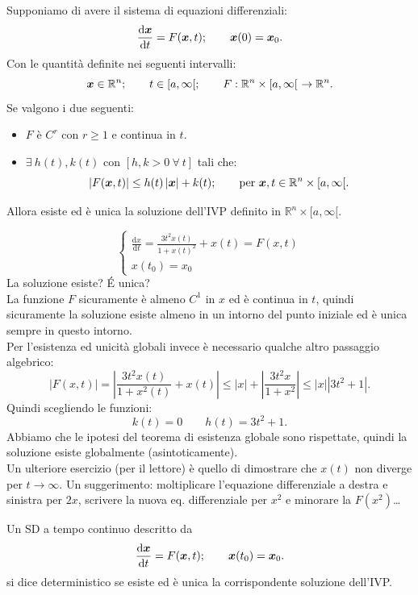 \noindent
\begin{thm}
    Supponiamo di avere il sistema di equazioni differenziali:
    \[
	\frac{\text{d} \boldsymbol{x}}{\text{d} t} = F(\boldsymbol{x},t); \qquad \boldsymbol{x}(0) = \boldsymbol{x}_0
    .\] 
    Con le quantità definite nei seguenti intervalli:
    \[
        \boldsymbol{x}\in \mathbb{R}^n; \qquad t \in [a,\infty[; \qquad F: \mathbb{R}^n\times [a,\infty[ \ \to \mathbb{R}^n
    .\] 
    Se valgono i due seguenti:
    \begin{itemize}
        \item $F$ è $C^r$ con $r\ge 1$ e continua in $t$.
	\item $\exists \ h(t), k(t)$ con $\left[h, k > 0 \ \forall \ t\right]$ tali che:
	    \[
		\left|F(\boldsymbol{x}, t)\right|\le h(t)\left|\boldsymbol{x}\right|+k(t); \qquad \text{per } \boldsymbol{x}, t \in \mathbb{R}^n\times [a, \infty[
	    .\] 
    \end{itemize}
    Allora esiste ed è unica la soluzione dell'IVP definito in $\mathbb{R}^n\times [a,\infty[$.
\end{thm}
\noindent
\begin{exmp}
   \[
       \begin{cases}
	   \frac{\text{d} x}{\text{d} t} = \frac{3t^2x(t)}{1+x(t)^2}+x(t) = F(x,t)\\
	   x(t_0)=x_0
       \end{cases}
   \]  
   La soluzione esiste? \'E unica? \\
   La funzione $F$  sicuramente è almeno $C^1$  in $x$  ed è continua in $t$, quindi sicuramente la soluzione esiste almeno in un intorno del punto iniziale ed è unica sempre in questo intorno.\\
   Per l'esistenza ed unicità globali invece è necessario qualche altro passaggio algebrico:
   \[
       \left|F(x,t)\right| = \left|\frac{3t^2x(t)}{1+x^2(t)} + x(t)\right|\le \left|x\right|+\left|\frac{3t^2x}{1+x^2}\right| \le
			    \left|x\right|\left|3t^2+1\right|
   .\] 
   Quindi scegliendo le funzioni:
   \[
       k(t)=0 \qquad h(t)=3t^2+1
   .\] 
   Abbiamo che le ipotesi del teorema di esistenza globale sono rispettate, quindi la soluzione esiste globalmente (asintoticamente).\\
   Un ulteriore esercizio (per il lettore) è quello di dimostrare che $x(t)$ non diverge per $t\to \infty$. Un suggerimento: moltiplicare l'equazione differenziale a destra e sinistra per $2x$, scrivere la nuova eq. differenziale per $x^2$ e minorare la $F(x^2)$\ldots 
\end{exmp}
\noindent
\begin{defn}
    Un SD a tempo continuo descritto da
    \[
	\frac{\text{d} \boldsymbol{x}}{\text{d} t} = F(\boldsymbol{x},t); \qquad \boldsymbol{x} (t_0)=\boldsymbol{x}_0
    .\] si dice deterministico se esiste ed è unica la corrispondente soluzione dell'IVP.
\end{defn}
\noindent
